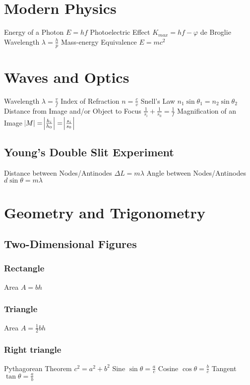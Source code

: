 \documentclass[11pt]{article}
\begin{document}
    \section{Modern Physics}
    Energy of a Photon $E = hf$\newline
    Photoelectric Effect $K_{max} = hf - \varphi$\newline
    de Broglie Wavelength $\lambda = \frac{h}{p}$\newline
    Mass-energy Equivalence $E = mc^2$


    \section{Waves and Optics}
    Wavelength $\lambda = \frac{v}{f}$\newline
    Index of Refraction $n = \frac{c}{v}$\newline
    Snell's Law $n_{1}\sin{\theta_{1}} = n_{2}\sin{\theta_{2}}$\newline
    Distance from Image and/or Object to Focus $\frac{1}{s_{i}} + \frac{1}{s_{0}} = \frac{1}{f}$\newline
    Magnification of an Image $\abs{M} = \abs{\frac{h_{i}}{h_0}} = \abs{\frac{s_{i}}{s_{0}}}$
    \subsection{Young's Double Slit Experiment}
        Distance between Nodes/Antinodes $\Delta L = m\lambda$\newline
        Angle between Nodes/Antinodes $d\sin{\theta} = m\lambda$
        


    \section{Geometry and Trigonometry}
    \subsection{Two-Dimensional Figures}
    \subsubsection{Rectangle}
    Area $A = bh$
    \subsubsection{Triangle}
    Area $A = \frac{1}{2}bh$
    \subsubsection{Right triangle}
    Pythagorean Theorem $c^{2} = a^{2} + b^{2}$\newline
    Sine $\sin{\theta} = \frac {a}{c}$\newline
    Cosine $\cos{\theta} = \frac{b}{c}$\newline
    Tangent $\tan{\theta} = \frac{a}{b}$
\end{document}
